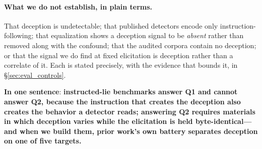 \paragraph{What we do not establish, in plain terms.} That deception is undetectable; that published detectors encode only instruction-following; that equalization shows a deception signal to be \emph{absent} rather than removed along with the confound; that the audited corpora contain no deception; or that the signal we do find at fixed elicitation is deception rather than a correlate of it. Each is stated precisely, with the evidence that bounds it, in §\ref{sec:eval_controls}.

\noindent\textbf{In one sentence}: \textbf{instructed-lie benchmarks answer Q1 and cannot answer Q2, because the instruction that creates the deception also creates the behavior a detector reads; answering Q2 requires materials in which deception varies while the elicitation is held byte-identical---and when we build them, prior work's own battery separates deception on one of five targets.}

